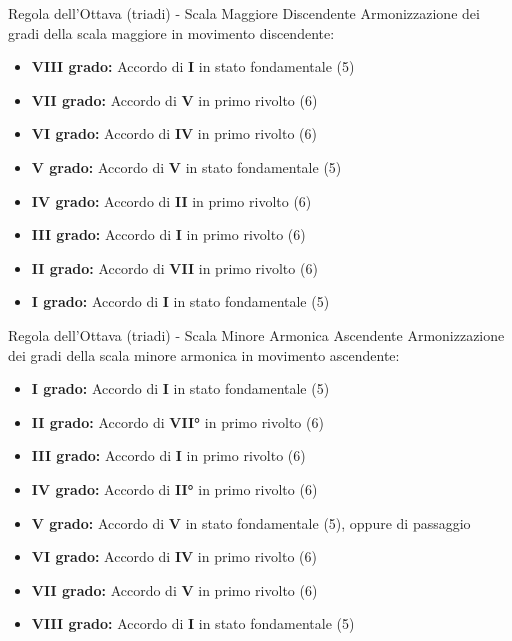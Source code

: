 \begin{regola}{Regola dell'Ottava (triadi) - Scala Maggiore Discendente}
	\label{reg:regola_ottava_maggiore_disc}
	Armonizzazione dei gradi della scala maggiore in movimento discendente:
	
	\begin{itemize}
		\item \textbf{VIII grado:} Accordo di \textbf{I} in stato fondamentale (5)
		\item \textbf{VII grado:} Accordo di \textbf{V} in primo rivolto (6)
		\item \textbf{VI grado:} Accordo di \textbf{IV} in primo rivolto (6)
		\item \textbf{V grado:} Accordo di \textbf{V} in stato fondamentale (5)
		\item \textbf{IV grado:} Accordo di \textbf{II} in primo rivolto (6)
		\item \textbf{III grado:} Accordo di \textbf{I} in primo rivolto (6)
		\item \textbf{II grado:} Accordo di \textbf{VII} in primo rivolto (6)
		\item \textbf{I grado:} Accordo di \textbf{I} in stato fondamentale (5)
	\end{itemize}
\end{regola}



\begin{regola}{Regola dell'Ottava (triadi) - Scala Minore Armonica Ascendente}
	\label{reg:regola_ottava_minore_asc}
	Armonizzazione dei gradi della scala minore armonica in movimento ascendente:
	
	\begin{itemize}
		\item \textbf{I grado:} Accordo di \textbf{I} in stato fondamentale (5)
		\item \textbf{II grado:} Accordo di \textbf{VII°} in primo rivolto (6)
		\item \textbf{III grado:} Accordo di \textbf{I} in primo rivolto (6)
		\item \textbf{IV grado:} Accordo di \textbf{II°} in primo rivolto (6)
		\item \textbf{V grado:} Accordo di \textbf{V} in stato fondamentale (5), oppure  di passaggio
		\item \textbf{VI grado:} Accordo di \textbf{IV} in primo rivolto (6)
		\item \textbf{VII grado:} Accordo di \textbf{V} in primo rivolto (6)
		\item \textbf{VIII grado:} Accordo di \textbf{I} in stato fondamentale (5)
	\end{itemize}
\end{regola}



